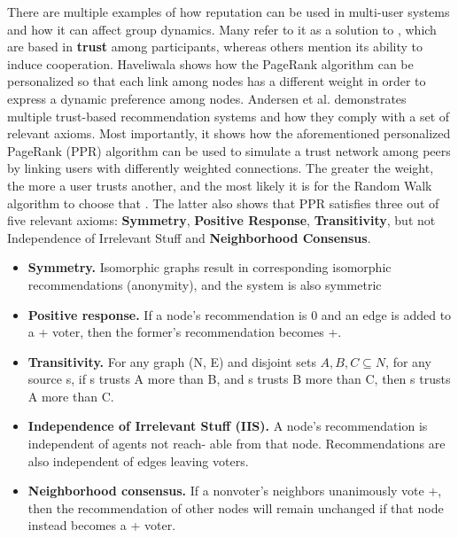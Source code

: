 There are multiple examples of how reputation can be used in multi-user systems and how it can affect group dynamics. Many refer to it as a solution to , which are based in \textbf{trust} among participants, whereas others mention its ability to induce cooperation. Haveliwala \cite{Haveliwala2003} shows how the PageRank algorithm can be personalized so that each link among nodes has a different weight in order to express a dynamic preference among nodes. Andersen et al. \cite{Andersen2008} demonstrates multiple trust-based recommendation systems and how they comply with a set of relevant axioms. Most importantly, it shows how the aforementioned personalized PageRank (PPR) algorithm can be used to simulate a trust network among peers by linking users with differently weighted connections. The greater the weight, the more a user trusts another, and the most likely it is for the Random Walk algorithm to choose that . The latter also shows that PPR satisfies three out of five relevant axioms: \textbf{Symmetry}, \textbf{Positive Response}, \textbf{Transitivity}, but not Independence of Irrelevant Stuff and \textbf{Neighborhood Consensus}.
\begin{itemize}
    \item \textbf{Symmetry.} Isomorphic graphs result in corresponding isomorphic recommendations (anonymity), and the system is also symmetric
    \item \textbf{Positive response.} If a node’s recommendation is 0 and an edge is added to a + voter, then the former’s recommendation becomes +.
    \item \textbf{Transitivity.} For any graph (N, E) and disjoint sets $ A, B, C \subseteq N $, for any source s, if s trusts A more than B, and s trusts B more than C, then s trusts A more than C.
    \item \textbf{Independence of Irrelevant Stuﬀ (IIS).} A node’s recommendation is independent of agents not reach- able from that node. Recommendations are also independent of edges leaving voters.
    \item \textbf{Neighborhood consensus.} If a nonvoter’s neighbors unanimously vote +, then the recommendation of other nodes will remain unchanged if that node instead becomes a + voter.
\end{itemize}

